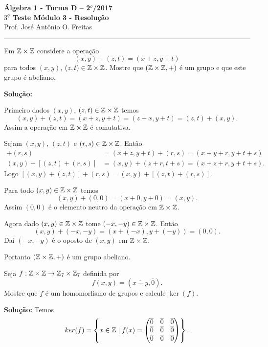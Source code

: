 \documentclass[12pt]{article}
\begin{document}


\begin{center}
{\Large\bf {\'A}lgebra 1 - Turma D -- 2$^{o}$/2017} \\ \vspace{9pt} {\large\bf
  $3^{\underline{o}}$ Teste Módulo 3 - Resolu\c{c}\~ao}\\
\vspace{9pt} Prof. Jos{\'e} Ant{\^o}nio O. Freitas
\end{center}
\hrule

\vspace{.6cm}

\questao Em $\mathbb{Z} \times\mathbb{Z}$ considere a operação
\[
	(x, y) + (z, t) = (x + z, y + t)
\]
para todos $(x,y)$, $(z,t) \in \mathbb{Z}\times\mathbb{Z}$. Mostre que $(\mathbb{Z}\times\mathbb{Z}, +)$ é um grupo e que este grupo é abeliano.

\noindent\textbf{Solu\c{c}\~ao:}

Primeiro dados $(x,y)$, $(z,t) \in \mathbb{Z}\times\mathbb{Z}$ temos
\[
	(x,y) + (z,t) = (x+z,y+t) = (z+x,y+t) = (z,t) + (x,y).
\]
Assim a operação em $\mathbb{Z}\times\mathbb{Z}$ é comutativa.

Sejam $(x,y)$, $(z,t)$ e $(r,s) \in \mathbb{Z}\times\mathbb{Z}$. Então
\begin{align*}
	[(x,y) + (z,t)] + (r,s) &= (x + z, y+t) + (r,s) = (x+y+r,y+t+s)\\
	(x,y) + [(z,t)+(r,s)] &= (x,y) + (z+r,t+s) = (x+z+r,y+t+s).
\end{align*}
Logo $[(x,y)+(z,t)] + (r,s) = (x,y) + [(z,t) + (r,s)]$.

Para todo $(x,y) \in \mathbb{Z}\times\mathbb{Z}$ temos
\[
	(x,y) + (0,0) = (x+0,y+0) = (x,y).
\]
Assim $(0,0)$ é o elemento neutro da operação em $\mathbb{Z}\times\mathbb{Z}$.

Agora dado $(x,y) \in \mathbb{Z}\times\mathbb{Z}$ tome $(-x,-y) \in \mathbb{Z}\times\mathbb{Z}$. Então
\[
	(x,y) + (-x,-y) = (x+(-x),y+(-y)) = (0,0).
\]
Daí $(-x,-y)$ é o oposto de $(x,y)$ em $\mathbb{Z}\times\mathbb{Z}$.

Portanto $(\mathbb{Z}\times\mathbb{Z},+)$ é um grupo abeliano.

\vspace{1cm}

\questao Seja $f : \mathbb{Z}\times\mathbb{Z} \to \mathbb{Z}_7\times\mathbb{Z}_7$ definida por
\[
	f(x,y) = (\overline{x-y},\overline{0}).
\]
Mostre que $f$ é um homomorfismo de grupos e calcule $\ker(f)$.

\noindent\textbf{Solu\c{c}\~ao:} Temos
\[
	ker(f) = \left\{x \in \mathbb{Z} \mid f(x) = \begin{pmatrix}
		\overline{0} & \overline{0} & \overline{0}\\
		\overline{0} & \overline{0} & \overline{0}\\
		\overline{0} & \overline{0} & \overline{0}
	\end{pmatrix}\right\}.
\]
\end{document}
